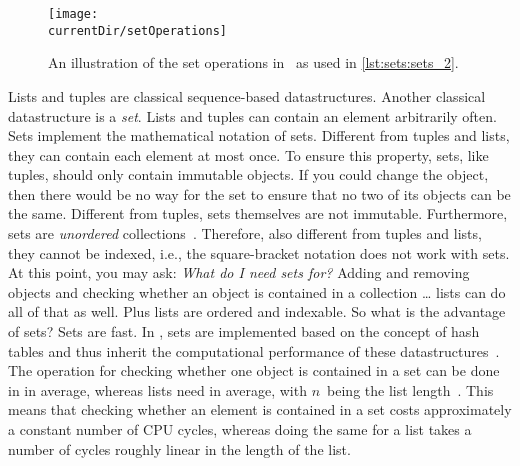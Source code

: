 %
\label{sec:sets}%
%
%
%
%
%
\begin{figure}%
\centering%
\texttt{[image: \\currentDir/setOperations]}%
\caption{An illustration of the set operations in \python\ as used in \cref{lst:sets:sets_2}.}%
\label{fig:setOperations}%
\end{figure}%
%
Lists and tuples are classical sequence-based datastructures.
Another classical datastructure is a \emph{set}.
Lists and tuples can contain an element arbitrarily often.
Sets implement the mathematical notation of sets.
Different from tuples and lists, they can contain each element at most once.
To ensure this property, sets, like tuples, should only contain immutable objects.
If you could change the object, then there would be no way for the set to ensure that no two of its objects can be the same.%
%
%
%
Different from tuples, sets themselves are not immutable.
Furthermore, sets are \emph{unordered} collections~\cite{PSF2024STSF}.
Therefore, also different from tuples and lists, they cannot be indexed, i.e., the square-bracket notation does not work with sets.%
%
%
%
At this point, you may ask:
\emph{What do I need sets for?}
Adding and removing objects and checking whether an object is contained in a collection {\dots} lists can do all of that as well.
Plus lists are ordered and indexable.
So what is the advantage of sets?
Sets are fast.
In \python, sets are implemented based on the concept of hash tables and thus inherit the computational performance of these datastructures~\cite{K1998SAS,CLRS2009ITA,SKS2019DSC}.
The operation for checking whether one object is contained in a set can be done in  in average, whereas lists need  in average, with $n$~being the list length~\cite{H2024PBOTTCODDSIPP33,B2023T,N2022CCSFPO}.
This means that checking whether an element is contained in a set costs approximately a constant number of CPU cycles, whereas doing the same for a list takes a number of cycles roughly linear in the length of the list.
